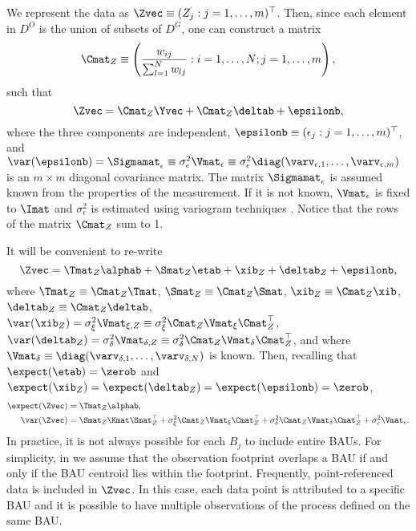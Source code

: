 We represent the data as $\Zvec \equiv (Z_j : j = 1,\dots,m)^\top$. Then, since each element in $D^O$ is the union of subsets of $D^G$, one can construct a matrix
$$
\Cmat_Z \equiv \left(\frac{w_{ij}}{\sum_{l=1}^N w_{lj}} : i = 1,\dots,N; j = 1,\dots,m\right),
$$
such that
\begin{equation*}
\Zvec = \Cmat_Z\Yvec + \Cmat_Z\deltab +  \epsilonb,
\end{equation*}
\noindent where the three components are independent, $\epsilonb \equiv (\epsilon_j : j = 1,\dots,m)^\top$, and $\var(\epsilonb) = \Sigmamat_\epsilon \equiv \sigma^2_\epsilon\Vmat_\epsilon \equiv \sigma^2_\epsilon \diag(\varv_{\epsilon,1},\dots,\varv_{\epsilon,m})$ is an $m \times m$ diagonal covariance matrix. The matrix $\Sigmamat_\epsilon$ is assumed known from the properties of the measurement. If it is not known, $\Vmat_\epsilon$ is fixed to $\Imat$ and $\sigma^2_\epsilon$ is estimated using variogram techniques \citep{Kang_2009}. Notice that the rows of  the matrix $\Cmat_Z$ sum to 1.



It will be convenient to re-write
\begin{equation}\label{eq:Z_collapsed}
\Zvec = \Tmat_Z\alphab + \Smat_Z\etab + \xib_Z + \deltab_Z + \epsilonb,
\end{equation}
where $\Tmat_Z \equiv \Cmat_Z \Tmat$, $\Smat_Z \equiv \Cmat_Z \Smat$, $\xib_Z \equiv \Cmat_Z \xib$, $\deltab_Z \equiv \Cmat_Z \deltab$, $\var(\xib_Z) = \sigma^2_\xi\Vmat_{\xi,Z} \equiv \sigma^2_\xi\Cmat_Z\Vmat_{\xi}\Cmat_Z^\top$, $\var(\deltab_Z) = \sigma^2_\delta\Vmat_{\delta,Z} \equiv \sigma^2_\delta\Cmat_Z\Vmat_\delta\Cmat_Z^\top$, and where $\Vmat_\delta \equiv \diag(\varv_{\delta,1},\dots,\varv_{\delta,N})$ is known. Then, recalling that $\expect(\etab) = \zerob$ and $\expect(\xib_Z) = \expect(\deltab_Z) = \expect(\epsilonb) = \zerob$,
\begin{align*}
\expect(\Zvec) &=\Tmat_Z\alphab,\\
\var(\Zvec) &= \Smat_Z\Kmat\Smat_Z^\top + \sigma^2_\xi\Cmat_Z\Vmat_{\xi}\Cmat_Z^\top +  \sigma^2_\delta\Cmat_Z\Vmat_\delta\Cmat_Z^\top + \sigma^2_\epsilon\Vmat_\epsilon.
\end{align*}
In practice, it is not always possible for each $B_j$ to include entire BAUs. For simplicity, in  we assume that the observation footprint overlaps a BAU if and only if the BAU centroid lies within the footprint. Frequently, point-referenced data is included in $\Zvec$. In this case, each data point is attributed to a specific BAU and it is possible to have multiple observations of the process defined on the same BAU.


